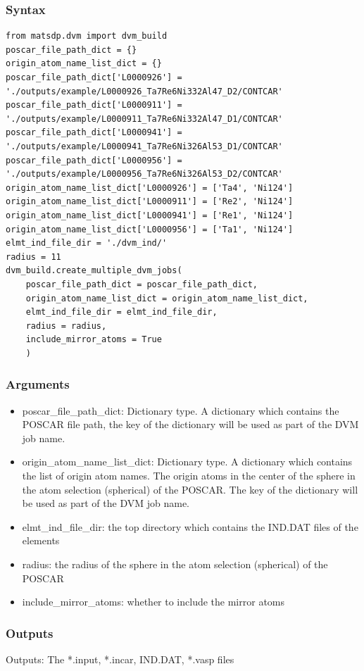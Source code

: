 \documentclass[12pt]{book}
\begin{document}
\subsubsection{Syntax}
\begin{lstlisting}
from matsdp.dvm import dvm_build
poscar_file_path_dict = {}
origin_atom_name_list_dict = {}
poscar_file_path_dict['L0000926'] = './outputs/example/L0000926_Ta7Re6Ni332Al47_D2/CONTCAR'
poscar_file_path_dict['L0000911'] = './outputs/example/L0000911_Ta7Re6Ni332Al47_D1/CONTCAR'
poscar_file_path_dict['L0000941'] = './outputs/example/L0000941_Ta7Re6Ni326Al53_D1/CONTCAR'
poscar_file_path_dict['L0000956'] =  './outputs/example/L0000956_Ta7Re6Ni326Al53_D2/CONTCAR'
origin_atom_name_list_dict['L0000926'] = ['Ta4', 'Ni124']
origin_atom_name_list_dict['L0000911'] = ['Re2', 'Ni124']
origin_atom_name_list_dict['L0000941'] = ['Re1', 'Ni124']
origin_atom_name_list_dict['L0000956'] = ['Ta1', 'Ni124']
elmt_ind_file_dir = './dvm_ind/'
radius = 11
dvm_build.create_multiple_dvm_jobs(
    poscar_file_path_dict = poscar_file_path_dict,
    origin_atom_name_list_dict = origin_atom_name_list_dict,
    elmt_ind_file_dir = elmt_ind_file_dir,
    radius = radius,
    include_mirror_atoms = True
    )
\end{lstlisting}
\subsubsection{Arguments}
\begin{itemize}
\item poscar\_file\_path\_dict: Dictionary type. A dictionary which contains the POSCAR file path, the key of the dictionary will be used as part of the DVM job name.
\item origin\_atom\_name\_list\_dict: Dictionary type. A dictionary which contains the list of origin atom names. The origin atoms in the center of the sphere in the atom selection (spherical) of the POSCAR. The key of the dictionary will be used as part of the DVM job name.
\item elmt\_ind\_file\_dir: the top directory which contains the IND.DAT files of the elements
\item radius: the radius of the sphere in the atom selection (spherical) of the POSCAR
\item include\_mirror\_atoms: whether to include the mirror atoms
\end{itemize}

\subsubsection{Outputs}
Outputs: The *.input, *.incar, IND.DAT, *.vasp files
\end{document}
